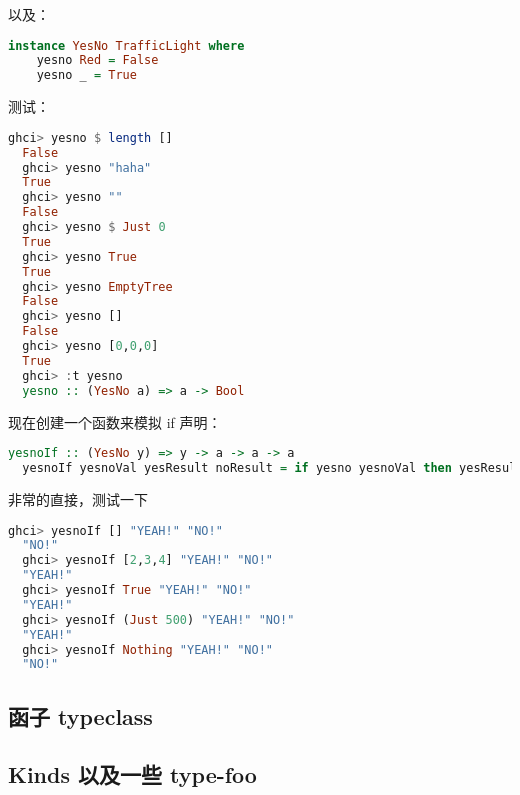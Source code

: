 \documentclass[./main.tex]{subfiles}
\begin{document}
以及：

\begin{lstlisting}[language=Haskell]
  instance YesNo TrafficLight where
    yesno Red = False
    yesno _ = True
\end{lstlisting}

测试：

\begin{lstlisting}[language=Haskell]
  ghci> yesno $ length []
  False
  ghci> yesno "haha"
  True
  ghci> yesno ""
  False
  ghci> yesno $ Just 0
  True
  ghci> yesno True
  True
  ghci> yesno EmptyTree
  False
  ghci> yesno []
  False
  ghci> yesno [0,0,0]
  True
  ghci> :t yesno
  yesno :: (YesNo a) => a -> Bool
\end{lstlisting}

现在创建一个函数来模拟 if 声明：

\begin{lstlisting}[language=Haskell]
  yesnoIf :: (YesNo y) => y -> a -> a -> a
  yesnoIf yesnoVal yesResult noResult = if yesno yesnoVal then yesResult else noResult
\end{lstlisting}

非常的直接，测试一下

\begin{lstlisting}[language=Haskell]
  ghci> yesnoIf [] "YEAH!" "NO!"
  "NO!"
  ghci> yesnoIf [2,3,4] "YEAH!" "NO!"
  "YEAH!"
  ghci> yesnoIf True "YEAH!" "NO!"
  "YEAH!"
  ghci> yesnoIf (Just 500) "YEAH!" "NO!"
  "YEAH!"
  ghci> yesnoIf Nothing "YEAH!" "NO!"
  "NO!"
\end{lstlisting}


\subsection*{函子 typeclass}




\subsection*{Kinds 以及一些 type-foo}

\end{document}
